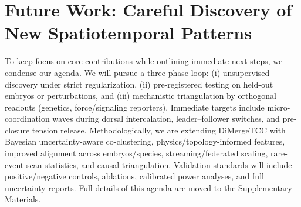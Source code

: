 \documentclass[unnumsec,webpdf,modern,large,namedate]{oup-authoring-template}%
\theoremstyle{thmstyleone}\newtheorem{theorem}{Theorem}
\theoremstyle{thmstyletwo}\newtheorem{example}{Example}
\theoremstyle{thmstylethree}\newtheorem{definition}{Definition}
\begin{document}



\section{Future Work: Careful Discovery of New Spatiotemporal Patterns}
\label{sec:future}

To keep focus on core contributions while outlining immediate next steps, we condense our agenda. We will pursue a three-phase loop: (i) unsupervised discovery under strict regularization, (ii) pre-registered testing on held-out embryos or perturbations, and (iii) mechanistic triangulation by orthogonal readouts (genetics, force/signaling reporters). Immediate targets include micro-coordination waves during dorsal intercalation, leader–follower switches, and pre-closure tension release. Methodologically, we are extending DiMergeTCC with Bayesian uncertainty-aware co-clustering, physics/topology-informed features, improved alignment across embryos/species, streaming/federated scaling, rare-event scan statistics, and causal triangulation. Validation standards will include positive/negative controls, ablations, calibrated power analyses, and full uncertainty reports. Full details of this agenda are moved to the Supplementary Materials.
\end{document}
